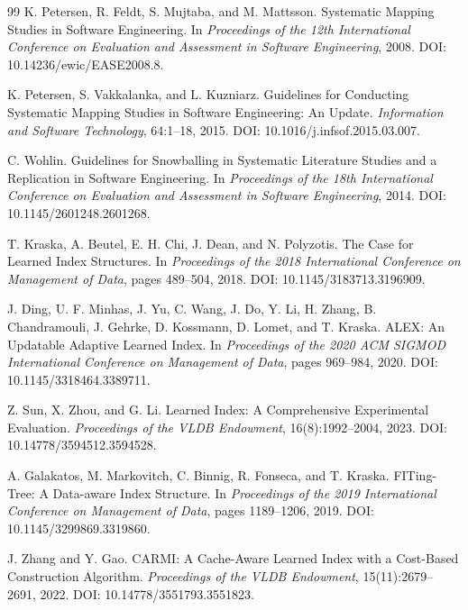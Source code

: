 \documentclass[a4paper, 12pt, twoside]{report}
\begin{document}
\renewcommand{\bibname}{Bibliography}
\renewcommand{\refname}{}
\begin{thebibliography}{99}
	   K. Petersen, R. Feldt, S. Mujtaba, and M. Mattsson.
	   Systematic Mapping Studies in Software Engineering.
	   In \textit{Proceedings of the 12th International Conference on Evaluation and Assessment in Software Engineering}, 2008.
	   DOI: 10.14236/ewic/EASE2008.8.

	   K. Petersen, S. Vakkalanka, and L. Kuzniarz.
	   Guidelines for Conducting Systematic Mapping Studies in Software Engineering: An Update.
	   \textit{Information and Software Technology}, 64:1--18, 2015.
	   DOI: 10.1016/j.infsof.2015.03.007.

	   C. Wohlin.
	   Guidelines for Snowballing in Systematic Literature Studies and a Replication in Software Engineering.
	   In \textit{Proceedings of the 18th International Conference on Evaluation and Assessment in Software Engineering}, 2014.
	   DOI: 10.1145/2601248.2601268.

   T. Kraska, A. Beutel, E. H. Chi, J. Dean, and N. Polyzotis.
   The Case for Learned Index Structures.
   In \textit{Proceedings of the 2018 International Conference on Management of Data}, pages 489--504, 2018.
   DOI: 10.1145/3183713.3196909.

   J. Ding, U. F. Minhas, J. Yu, C. Wang, J. Do, Y. Li, H. Zhang, B. Chandramouli, J. Gehrke, D. Kossmann, D. Lomet, and T. Kraska.
   ALEX: An Updatable Adaptive Learned Index.
   In \textit{Proceedings of the 2020 ACM SIGMOD International Conference on Management of Data}, pages 969--984, 2020.
   DOI: 10.1145/3318464.3389711.

   Z. Sun, X. Zhou, and G. Li.
   Learned Index: A Comprehensive Experimental Evaluation.
   \textit{Proceedings of the VLDB Endowment}, 16(8):1992--2004, 2023.
   DOI: 10.14778/3594512.3594528.

   A. Galakatos, M. Markovitch, C. Binnig, R. Fonseca, and T. Kraska.
   FITing-Tree: A Data-aware Index Structure.
   In \textit{Proceedings of the 2019 International Conference on Management of Data}, pages 1189--1206, 2019.
   DOI: 10.1145/3299869.3319860.

   J. Zhang and Y. Gao.
   CARMI: A Cache-Aware Learned Index with a Cost-Based Construction Algorithm.
   \textit{Proceedings of the VLDB Endowment}, 15(11):2679--2691, 2022.
   DOI: 10.14778/3551793.3551823.


\end{thebibliography}
\end{document}
